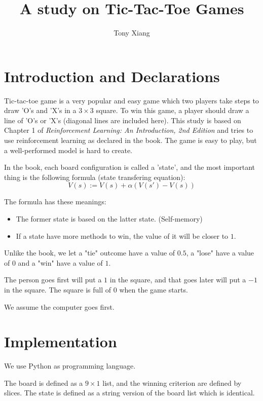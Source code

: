 \documentclass{article}
\title{A study on Tic-Tac-Toe Games}
\author{Tony Xiang}
\begin{document}
\maketitle
\tableofcontents

\section{Introduction and Declarations}
Tic-tac-toe game is a very popular and easy game which two players take steps to draw 'O's and 'X's in a $3 \times 3$ square. To win this game, a player should draw a line of 'O's or 'X's (diagonal lines are included here). This study is based on Chapter 1 of \textit{Reinforcement Learning: An Introduction, 2nd Edition} and tries to use reinforcement learning as declared in the book. The game is easy to play, but a well-performed model is hard to create.

In the book, each board configuration is called a 'state', and the most important thing is the following formula (state transfering equation):
\begin{equation*}
    V(s) := V(s) + \alpha (V(s') - V(s))
\end{equation*}

The formula has these meanings:
\begin{itemize}
    \item The former state is based on the latter state. (Self-memory)
    \item If a state have more methods to win, the value of it will be closer to $1$.
\end{itemize}

Unlike the book, we let a "tie" outcome have a value of $0.5$, a "lose" have a value of $0$ and a "win" have a value of $1$.

The person goes first will put a $1$ in the square, and that goes later will put a $-1$ in the square. The square is full of $0$ when the game starts.

We assume the computer goes first.

\section{Implementation}
We use Python as programming language. 

The board is defined as a $9 \times 1$ list, and the winning criterion are defined by slices. The state is defined as a string version of the board list which is identical.
\end{document}

